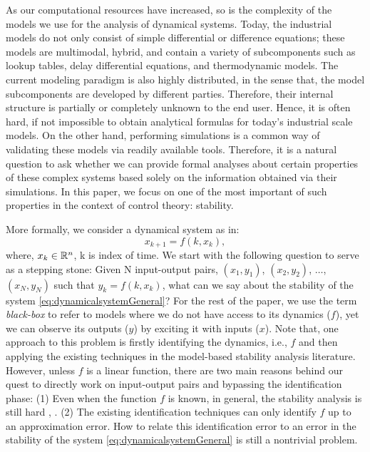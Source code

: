 
As our computational resources have increased, so is the complexity of the models we use for the analysis of dynamical systems. Today, the industrial models do not only consist of simple differential or difference equations; these models are multimodal, hybrid, and contain a variety of subcomponents such as lookup tables, delay differential equations, and thermodynamic models. The current modeling paradigm is also highly distributed, in the sense that, the model subcomponents are developed by different parties. Therefore, their internal structure is partially or completely unknown to the end user. Hence, it is often hard, if not impossible to obtain analytical formulas for today's industrial scale models. On the other hand, performing simulations is a common way of validating these models via readily available tools. Therefore, it is a natural question to ask whether we can provide formal analyses about certain properties of these complex systems based solely on the information obtained via their simulations. In this paper, we focus on one of the most important of such properties in the context of control theory: stability.

More formally, we consider a dynamical system as in:
\begin{equation}\label{eq:dynamicalsystemGeneral}x_{k+1} = f(k, x_k),
\end{equation}
where, $x_k \in \mathbb{R}^n$, k is index of time.
We start with the following question to serve as a stepping stone: Given N input-output pairs, $(x_1, y_1)$, $(x_2, y_2)$, $\ldots$, $(x_N, y_N)$ such that $y_{k} = f(k, x_k)$, what can we say about the stability of the system \eqref{eq:dynamicalsystemGeneral}? For the rest of the paper, we use the term \emph{black-box} to refer to models where we do not have access to its dynamics ($f$), yet we can observe its outputs ($y$) by exciting it with inputs ($x$). Note that, one approach to this problem is firstly identifying the dynamics, i.e., $f$ and then applying the existing techniques in the model-based stability analysis literature. However, unless $f$ is a linear function, there are two main reasons behind our quest to directly work on input-output pairs and bypassing the identification phase: (1) Even when the function $f$ is known, in general, the stability analysis is still hard \cite{stabilityHard1}, \cite{stabilityHard2}. (2) The existing identification techniques can only identify $f$ up to an approximation error. How to relate this identification error to an error in the stability of the system \eqref{eq:dynamicalsystemGeneral} is still a nontrivial problem.

